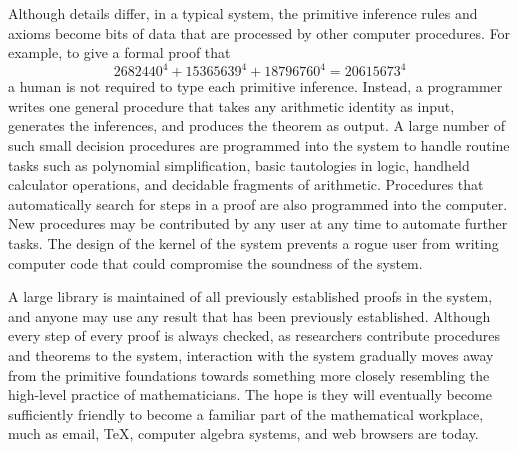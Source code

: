 \documentclass{llncs}
\begin{document}
Although details differ, 
in a typical system, the primitive inference rules and axioms
become bits of data that are processed by other computer procedures.
For example, to give a formal proof that 
$$
2682440^4 + 15365639^4 + 18796760^4 = 20615673^4
$$
a human is not required to type each primitive inference.  Instead,
a programmer writes one general procedure that takes any arithmetic
identity as input,  generates the inferences,
and produces the theorem as output.   A large number of such
small decision procedures are programmed into the system to handle
routine tasks such as polynomial simplification, basic tautologies in logic,
handheld calculator operations, 
and decidable fragments of arithmetic.  
Procedures that automatically search for steps in a proof
are also programmed into the computer.  
New procedures may be contributed
by any user at any time to automate further tasks.
The design of the kernel of the system prevents a rogue
user from writing computer code that could compromise the soundness of the system.%


A large library is maintained
of all previously established proofs in the system, and anyone may
use any result that has been previously established.
 Although every step of every proof is
always checked,
as researchers contribute procedures and theorems to the system,
interaction with the system gradually moves
away from the primitive foundations towards something more closely
resembling the high-level practice of mathematicians.
%
The hope
is they will eventually become sufficiently friendly
to become a familiar part of the 
mathematical workplace, much as email, \TeX\relax, computer algebra systems, and
web browsers are today.


%
\end{document}
